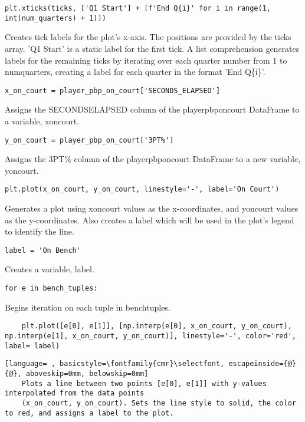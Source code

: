 \documentclass{article}
\begin{document}
\begin{lstlisting}
plt.xticks(ticks, ['Q1 Start'] + [f'End Q{i}' for i in range(1, int(num_quarters) + 1)])
\end{lstlisting}
Creates tick labels for the plot's x-axis. The positions are provided by the ticks array. 'Q1 Start' is a static label for the first tick. A list comprehension generates labels for the remaining ticks by iterating over each quarter number from 1 to num\textunderscore quarters, creating a label for each quarter in the format 'End Q\{i\}'.
\begin{lstlisting}
x_on_court = player_pbp_on_court['SECONDS_ELAPSED']
\end{lstlisting}
Assigns the SECONDS\textunderscore ELAPSED column of the player\textunderscore pbp\textunderscore on\textunderscore court DataFrame to a variable, x\textunderscore on\textunderscore court.
\begin{lstlisting}
y_on_court = player_pbp_on_court['3PT%']
\end{lstlisting}
Assigns the 3PT\% column of the player\textunderscore pbp\textunderscore on\textunderscore court DataFrame to a new variable, y\textunderscore on\textunderscore court.
\begin{lstlisting}
plt.plot(x_on_court, y_on_court, linestyle='-', label='On Court')
\end{lstlisting}
Generates a plot using x\textunderscore on\textunderscore court values as the x-coordinates, and y\textunderscore on\textunderscore court values as the y-coordinates. Also creates a label which will be used in the plot's legend to identify the line.
\begin{lstlisting}
label = 'On Bench'
\end{lstlisting}
Creates a variable, label.
\begin{lstlisting}
for e in bench_tuples:
\end{lstlisting}
Begins iteration on each tuple in bench\textunderscore tuples.
\begin{lstlisting}
    plt.plot([e[0], e[1]], [np.interp(e[0], x_on_court, y_on_court), np.interp(e[1], x_on_court, y_on_court)], linestyle='-', color='red', label= label)
\end{lstlisting}
\begin{lstlisting}[language= , basicstyle=\fontfamily{cmr}\selectfont, escapeinside={@}{@}, aboveskip=0mm, belowskip=0mm]
    Plots a line between two points [e[0], e[1]] with y-values interpolated from the data points
    (x_on_court, y_on_court). Sets the line style to solid, the color to red, and assigns a label to the plot.
\end{lstlisting}
\end{document}
